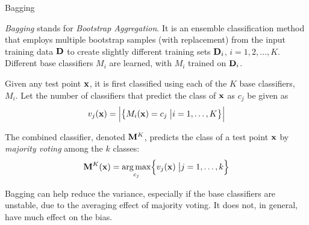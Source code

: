 \begin{frame}{Bagging}

{\em Bagging} stands for {\em Bootstrap Aggregation}. It is an
ensemble classif\/{i}cation method that employs multiple bootstrap samples
(with replacement) from the input training data $\mathbf{D}$ to create
slightly different training sets $\mathbf{D}_i$, $i=1,2,\ldots,K$.
Different base classif\/{i}ers $M_i$ are
learned, with $M_i$ trained on $\mathbf{D}_i$.

\medskip Given any test point $\mathbf{x}$, it is f\/{i}rst classif\/{i}ed
using each of the $K$ base classif\/{i}ers, $M_i$. Let the number of
classif\/{i}ers that predict the class of $\mathbf{x}$ as $c_{j}$ be given as
\begin{align*}
v_{j}(\mathbf{x}) =
\Bigl|\bigl\{M_i(\mathbf{x}) = c_{j} \;\bigl| i = 1,\ldots,K\bigr\} \Bigr|
\end{align*}


The combined classif\/{i}er, denoted $\mathbf{M}^K$, predicts the class of a
test point $\mathbf{x}$ by {\em majority voting} among the $k$ classes:
\begin{align*}
  \mathbf{M}^K(\mathbf{x}) = \mathop{\arg\max}_{c_{j}} \Bigl\{ v_{j}(\mathbf{x}) \;\bigl| j=1,\ldots,k \Bigr\}
\end{align*}

Bagging can help reduce the variance, especially if the base
classif\/{i}ers are unstable, due to the averaging effect of majority
voting. It does not, in general, have much effect on the bias.
\end{frame}



